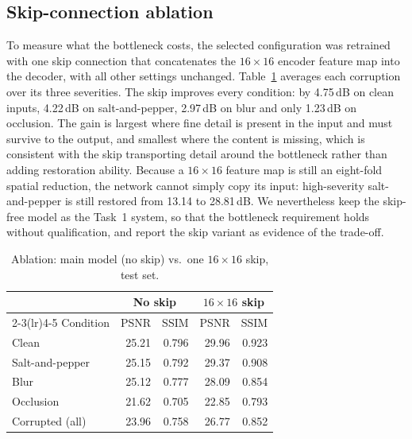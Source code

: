 \documentclass[conference]{IEEEtran}
\begin{document}
\subsection{Skip-connection ablation}
\label{sec:task1_ablation}
To measure what the bottleneck costs, the selected configuration was
retrained with one skip connection that concatenates the $16\times16$ encoder
feature map into the decoder, with all other settings unchanged.
Table~\ref{tab:task1_ablation} averages each corruption over its three
severities. The skip improves every condition: by 4.75\,dB on clean inputs,
4.22\,dB on salt-and-pepper, 2.97\,dB on blur and only 1.23\,dB on occlusion.
The gain is largest where fine detail is present in the input and must
survive to the output, and smallest where the content is missing, which is
consistent with the skip transporting detail around the bottleneck rather
than adding restoration ability. Because a $16\times16$ feature map is still
an eight-fold spatial reduction, the network cannot simply copy its input:
high-severity salt-and-pepper is still restored from 13.14 to 28.81\,dB. We
nevertheless keep the skip-free model as the Task~1 system, so that the
bottleneck requirement holds without qualification, and report the skip
variant as evidence of the trade-off.

\begin{table}[t]
\centering
\caption{Ablation: main model (no skip) vs.\ one $16\times16$ skip, test set.}
\label{tab:task1_ablation}
\footnotesize
\begin{tabular}{lrrrr}
\toprule
 & \multicolumn{2}{c}{No skip} & \multicolumn{2}{c}{$16\times16$ skip} \\
\cmidrule(lr){2-3}\cmidrule(lr){4-5}
Condition & PSNR & SSIM & PSNR & SSIM \\
\midrule
Clean           & 25.21 & 0.796 & 29.96 & 0.923 \\
Salt-and-pepper & 25.15 & 0.792 & 29.37 & 0.908 \\
Blur            & 25.12 & 0.777 & 28.09 & 0.854 \\
Occlusion       & 21.62 & 0.705 & 22.85 & 0.793 \\
Corrupted (all) & 23.96 & 0.758 & 26.77 & 0.852 \\
\bottomrule
\end{tabular}
\end{table}
\end{document}
